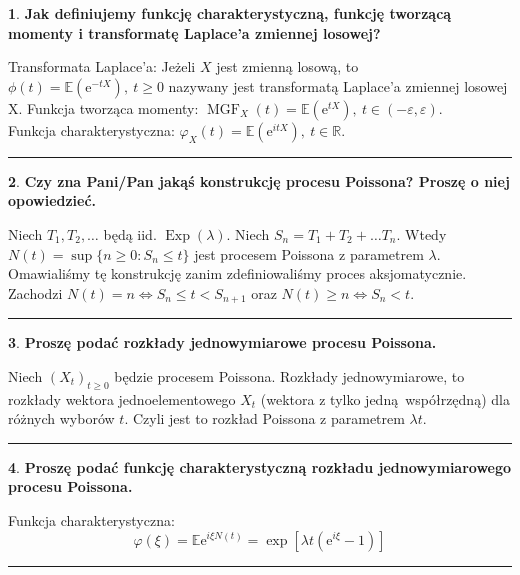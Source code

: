 \documentclass[
    twocolumn,
    twoside,
    fontsize=11pt,
    paper=A0,
    DIV=30
]{scrartcl}
\theoremstyle{definition}
\newtheorem{pytanie}{}
\theoremstyle{break}
\newenvironment{odpowiedź}{\vspace{-0.7em}}{\vspace{0.3em}\hrule}
\newcommand*{\e}{\mathrm{e}}
\begin{document}
\begin{pytanie}
\textbf{Jak definiujemy funkcję charakterystyczną, funkcję tworzącą momenty i transformatę Laplace'a zmiennej losowej?}
\end{pytanie}
\begin{odpowiedź}
    Transformata Laplace'a: Jeżeli $X$ jest zmienną losową,
    to $\phi(t) = \mathbb{E}(\e^{-tX}), \ t \geq 0$
    nazywany jest transformatą Laplace'a zmiennej losowej X.
    Funkcja tworząca momenty: $\operatorname{MGF}_X(t)
    = \mathbb{E} (\e^{tX}), \ t \in (-\varepsilon, \varepsilon)$. \\
    Funkcja charakterystyczna: $\varphi_X(t)
    = \mathbb{E} (\e^{itX}), \ t \in \mathbb{R}$.
\end{odpowiedź}


\begin{pytanie}
\textbf{Czy zna Pani/Pan jakąś konstrukcję procesu Poissona? Proszę o niej opowiedzieć.}
\end{pytanie}
\begin{odpowiedź}
    Niech $T_1, T_2, \ldots$ będą iid. $\operatorname{Exp}(\lambda)$.
    Niech $S_n = T_1 + T_2 + \ldots T_n$.
    Wtedy $N(t) =\sup\{n \geq 0: S_n \leq t\}$ jest procesem Poissona
    z parametrem $\lambda$.
    Omawialiśmy tę konstrukcję zanim zdefiniowaliśmy proces aksjomatycznie.
    Zachodzi $N(t) = n \iff S_n \leq t < S_{n+1}$ oraz $N(t) \geq n \iff S_n < t$.
\end{odpowiedź}


\begin{pytanie}
\textbf{Proszę podać rozkłady jednowymiarowe procesu Poissona.}
\end{pytanie}
\begin{odpowiedź}
    Niech $(X_t)_{t\geq 0}$ będzie procesem Poissona.
    Rozkłady jednowymiarowe, to rozkłady wektora jednoelementowego
    $X_t$ (wektora z tylko jedną współrzędną) dla różnych wyborów $t$.
    Czyli jest to rozkład Poissona z parametrem $\lambda t$.
\end{odpowiedź}


\begin{pytanie}
\textbf{Proszę podać funkcję charakterystyczną rozkładu jednowymiarowego procesu Poissona.}
\end{pytanie}
\begin{odpowiedź}
    Funkcja charakterystyczna: \[
    \varphi(\xi) = \mathbb{E}\e^{i\xi N(t)} = \exp[\lambda t (\e^{i\xi} - 1)]
    \]
\end{odpowiedź}
\end{document}
